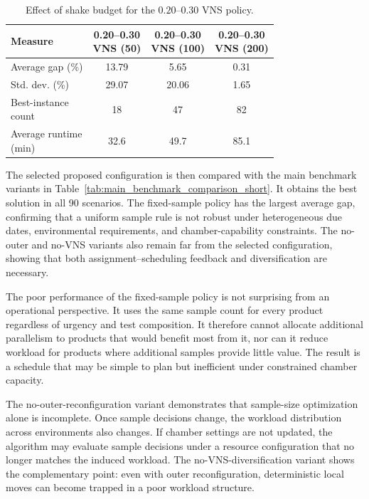 \documentclass[11pt]{article}
\begin{document}
\begin{table}[H]
\centering
\caption{Effect of shake budget for the \(0.20\)--\(0.30\) VNS policy.}
\label{tab:vns_budget_comparison_short}
\begin{tabular}{lccc}
\hline
\textbf{Measure}
& \shortstack{\textbf{0.20--0.30}\\\textbf{VNS (50)}}
& \shortstack{\textbf{0.20--0.30}\\\textbf{VNS (100)}}
& \shortstack{\textbf{0.20--0.30}\\\textbf{VNS (200)}} \\
\hline
Average gap (\%) & 13.79 & 5.65 & 0.31 \\
Std. dev. (\%) & 29.07 & 20.06 & 1.65 \\
\shortstack[l]{Best-instance\\count} & 18 & 47 & 82 \\
\shortstack[l]{Average runtime\\(min)} & 32.6 & 49.7 & 85.1 \\
\hline
\end{tabular}
\end{table}

The selected proposed configuration is then compared with the main benchmark variants in Table~\ref{tab:main_benchmark_comparison_short}. It obtains the best solution in all 90 scenarios. The fixed-sample policy has the largest average gap, confirming that a uniform sample rule is not robust under heterogeneous due dates, environmental requirements, and chamber-capability constraints. The no-outer and no-VNS variants also remain far from the selected configuration, showing that both assignment--scheduling feedback and diversification are necessary.

The poor performance of the fixed-sample policy is not surprising from an operational perspective. It uses the same sample count for every product regardless of urgency and test composition. It therefore cannot allocate additional parallelism to products that would benefit most from it, nor can it reduce workload for products where additional samples provide little value. The result is a schedule that may be simple to plan but inefficient under constrained chamber capacity.

The no-outer-reconfiguration variant demonstrates that sample-size optimization alone is incomplete. Once sample decisions change, the workload distribution across environments also changes. If chamber settings are not updated, the algorithm may evaluate sample decisions under a resource configuration that no longer matches the induced workload. The no-VNS-diversification variant shows the complementary point: even with outer reconfiguration, deterministic local moves can become trapped in a poor workload structure.
\end{document}
